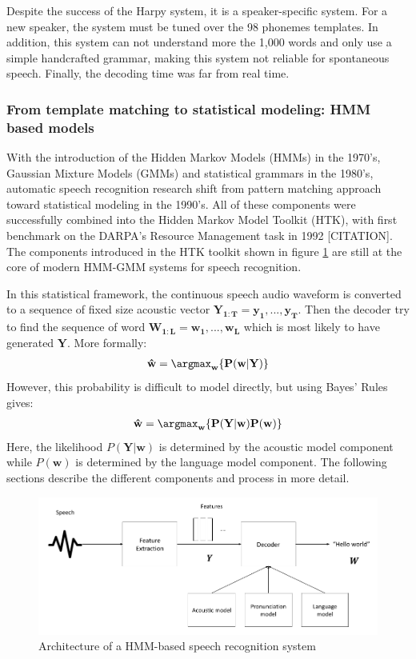 Despite the success of the Harpy system, it is a  speaker-specific system. For a new speaker, the system must be tuned over the 98 phonemes templates. In addition, this system can not understand more the 1,000 words and only use a simple handcrafted grammar, making this system not reliable for spontaneous speech. Finally, the decoding time was far from real time.


\subsubsection{From template matching to statistical modeling: HMM based models}
With the introduction of the Hidden Markov Models (HMMs) in the 1970's, Gaussian Mixture Models (GMMs) and statistical grammars in the 1980's, automatic speech recognition research shift from pattern matching approach toward  statistical modeling in the 1990's. All of these components were successfully combined into the Hidden Markov Model Toolkit (HTK), with first benchmark on the DARPA's Resource Management task in 1992 [CITATION]. The components introduced in the HTK toolkit shown in figure \ref{HMM-GMM-model} are still at the core of modern HMM-GMM systems for speech recognition. 

In this statistical framework, the continuous speech audio waveform is converted to a sequence of fixed size acoustic vector $\boldsymbol{Y_{1:T}=y_1,...,y_T}$. Then the decoder try to find the sequence of word $\boldsymbol{W_{1:L}=w_1,...,w_L}$ which is most likely to have generated $\boldsymbol{Y}$. More formally:
\begin{align}\mathbf{
    \hat{w} = \argmax_w \{P(w|Y)\}
}\end{align}
However, this probability is difficult to model directly, but using Bayes' Rules gives:
\begin{align}\mathbf{
    \hat{w} = \argmax_w \{P(Y|w)P(w)\}
}\end{align}
Here, the likelihood $P(\boldsymbol{Y}|\boldsymbol{w})$ is determined by the acoustic model component while $P(\boldsymbol{w})$ is determined by the language model component.
The following sections describe the different components and process in more detail.
\begin{figure}[h]
\includegraphics[width=\textwidth]{imgs/HMM-GMM architecture.png}
\caption{Architecture of a HMM-based speech recognition system}
\label{HMM-GMM-model}
\end{figure}


